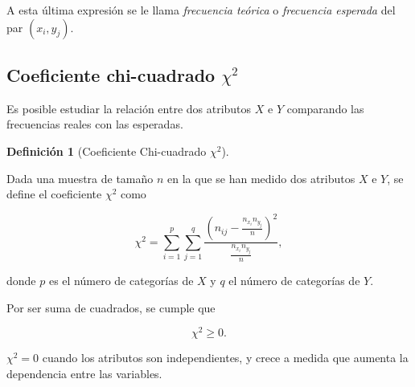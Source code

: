 \documentclass[
  spanish,
  a4paper,
]{scrreport}
\theoremstyle{plain}
\theoremstyle{definition}
\theoremstyle{definition}
\newtheorem{definition}{Definición}[chapter]
\theoremstyle{remark}
\begin{document}
A esta última expresión se le llama \emph{frecuencia teórica} o
\emph{frecuencia esperada} del par \((x_i,y_j)\).

\subsection{\texorpdfstring{Coeficiente chi-cuadrado
\(\chi^2\)}{Coeficiente chi-cuadrado \textbackslash chi\^{}2}}\label{coeficiente-chi-cuadrado-chi2}

Es posible estudiar la relación entre dos atributos \(X\) e \(Y\)
comparando las frecuencias reales con las esperadas.

\begin{definition}[Coeficiente Chi-cuadrado
\(\chi^2\)]\protect\hypertarget{def-coeficiente-chi-cuadrado}{}\label{def-coeficiente-chi-cuadrado}

Dada una muestra de tamaño \(n\) en la que se han medido dos atributos
\(X\) e \(Y\), se define el coeficiente \(\chi^2\) como

\[
\chi^2 = \sum_{i=1}^p\sum_{j=1}^q \frac{\left(n_{ij}-\frac{n_{x_i}n_{y_j}}{n}\right)^2}{\frac{n_{x_i}n_{y_j}}{n}},
\]

donde \(p\) es el número de categorías de \(X\) y \(q\) el número de
categorías de \(Y\).

\end{definition}

\begin{tcolorbox}[enhanced jigsaw, arc=.35mm, bottomrule=.15mm, bottomtitle=1mm, breakable, colback=white, colbacktitle=quarto-callout-important-color!10!white, colframe=quarto-callout-important-color-frame, coltitle=black, left=2mm, leftrule=.75mm, opacityback=0, opacitybacktitle=0.6, rightrule=.15mm, title=\textcolor{quarto-callout-important-color}{\faExclamation}\hspace{0.5em}{Importante}, titlerule=0mm, toprule=.15mm, toptitle=1mm]

Por ser suma de cuadrados, se cumple que

\[\chi^2 \geq 0.\]

\end{tcolorbox}

\begin{tcolorbox}[enhanced jigsaw, arc=.35mm, bottomrule=.15mm, bottomtitle=1mm, breakable, colback=white, colbacktitle=quarto-callout-note-color!10!white, colframe=quarto-callout-note-color-frame, coltitle=black, left=2mm, leftrule=.75mm, opacityback=0, opacitybacktitle=0.6, rightrule=.15mm, title=\textcolor{quarto-callout-note-color}{\faInfo}\hspace{0.5em}{Interpretación}, titlerule=0mm, toprule=.15mm, toptitle=1mm]

\(\chi^2=0\) cuando los atributos son independientes, y crece a medida
que aumenta la dependencia entre las variables.

\end{tcolorbox}
\end{document}
